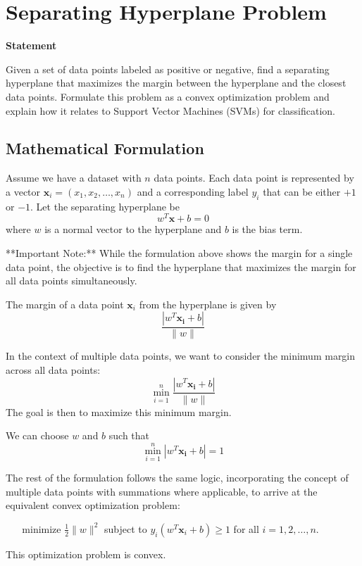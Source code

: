 \documentclass{article}
\begin{document}
\section*{Separating Hyperplane Problem}

\textbf{Statement}

Given a set of data points labeled as positive or negative, find a separating hyperplane that maximizes the margin between the hyperplane and the closest data points. Formulate this problem as a convex optimization problem and explain how it relates to Support Vector Machines (SVMs) for classification.

\subsection*{Mathematical Formulation}

\begin{flushleft}
Assume we have a dataset with $n$ data points. Each data point is represented by a vector $\mathbf{x}_i = (x_1, x_2, \ldots, x_n)$ and a corresponding label $y_i$ that can be either $+1$ or $-1$. Let the separating hyperplane be 
\begin{equation}
    w^T \mathbf{x} + b = 0
\end{equation}
where $w$ is a normal vector to the hyperplane and $b$ is the bias term.

**Important Note:** While the formulation above shows the margin for a single data point, the objective is to find the hyperplane that maximizes the margin for all data points simultaneously.

The margin of a data point $\mathbf{x}_i$ from the hyperplane is given by
\begin{equation}
    \frac{|w^T \mathbf{x_i} + b|}{\|w\|}
\end{equation}

In the context of multiple data points, we want to consider the minimum margin across all data points:
\begin{equation}
    \min_{i=1}^n \frac{|w^T \mathbf{x_i} + b|}{\|w\|}
\end{equation}
The goal is then to maximize this minimum margin.

We can choose $w$ and $b$ such that
\begin{equation}
    \min_{i=1}^n |w^T \mathbf{x_i} + b| = 1
\end{equation}

The rest of the formulation follows the same logic, incorporating the concept of multiple data points with summations where applicable, to arrive at the equivalent convex optimization problem:

\begin{center}
    minimize $\frac{1}{2} \|w\|^2$ subject to $y_i(w^T \mathbf{x}_i + b) \geq 1$ for all $i = 1, 2, \ldots, n$.
\end{center}

This optimization problem is convex.
\end{flushleft}
\end{document}
